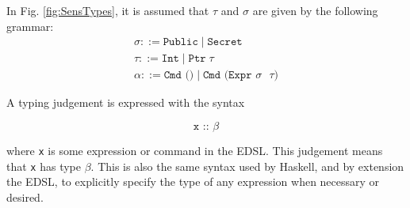 \documentclass[10pt, conference]{IEEEtran}
\newcommand{\ttt}{\texttt}
\begin{document}
In Fig. \ref{fig:SensTypes}, it is assumed that $\tau$ and $\sigma$ are given by the
following grammar:
\begin{gather*}
  \sigma ::= \ttt{Public}\;|\;\ttt{Secret}\\
  \tau ::= \ttt{Int}\;|\;\ttt{Ptr}\;\tau\\
  \alpha ::= \ttt{Cmd ()}\;|\;\ttt{Cmd (Expr $\sigma$ $\tau$)}
\end{gather*}

A typing judgement is expressed with the syntax

\begin{equation*}
  \ttt{x :: $\beta$}
\end{equation*}

where \ttt{x} is some expression or command in the EDSL. This judgement means
that \ttt{x} has type $\beta$. This is also the same syntax used by Haskell, and by extension
the EDSL, to explicitly specify the type of any expression when necessary or desired.
\end{document}
